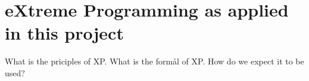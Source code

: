 \section{eXtreme Programming as applied in this project}
What is the priciples of XP.
What is the formål of XP.
How do we expect it to be used?
